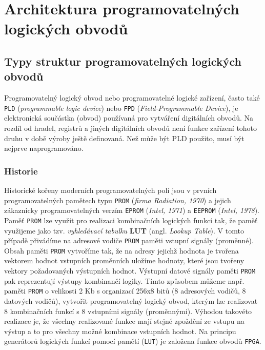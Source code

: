 \setchaptertoc
\chapter{Architektura programovatelných logických obvodů}


  \section{Typy struktur programovatelných logic\-kých obvodů}
    Programovatelný logický obvod nebo programovatelné logické zařízení, často také \texttt{PLD}
    (\emph{programmable logic device}) nebo \texttt{FPD} (\emph{Field-Programmable Device}), je
    elektronická součástka (obvod) používaná pro vytváření digitálních obvodů. Na rozdíl od hradel,
    registrů a jiných digitálních obvodů není funkce zařízení tohoto druhu v době výroby ještě
    definovaná. Než může být PLD použito, musí být nejprve naprogramováno.
    
    \subsection{Historie}
      Historické kořeny moderních programovatelných polí jsou v prvních progra\-mo\-va\-tel\-ných
      pamětech typu \texttt{PROM} (\emph{firma Radiation, 1970}) a jejich zákaznicky
      programovatelných verzím \texttt{EPROM} (\emph{Intel, 1971}) a \texttt{EEPROM} (\emph{Intel,
      1978}). Paměť \texttt{PROM} lze využít pro realizaci kombinačních logických funkcí tak, že
      paměť využijeme jako tzv. \emph{vyhledávací tabulku} \textbf{LUT} (angl. \emph{Lookup
      Table}). V tomto případě přivádíme na adresové vodiče \texttt{PROM} paměti vstupní signály
      (proměnné). Obsah paměti \texttt{PROM} vytvoříme tak, že na adresy jejichž hodnota je tvořena
      vektorem hodnot vstupních proměnních uložíme hodnoty, které jsou tvořeny vektory požadovaných
      výstupních hodnot. Výstupní datové signály paměti \texttt{PROM} pak reprezentují výstupy
      kombinančí logiky. Tímto způsobem můžeme např. paměti \texttt{PROM} o velikosti 2 Kb s
      organizací 256x8 bitů (8 adresových vodičů, 8 datových vodičů), vytvořit programovatelný
      logický obvod, kterým lze realizovat 8 kombinačních funkcí s 8 vstupními signály
      (proměnnými). Výhodou takovéto realizace je, že všechny realizované funkce mají stejné
      zpoždění ze vstupu na výstup a to pro všechny možné kombinace vstupních hodnot. Na principu
      generátorů logických funkcí pomocí pamětí (\texttt{LUT}) je založena funkce obvodů
      \texttt{FPGA}.
      
